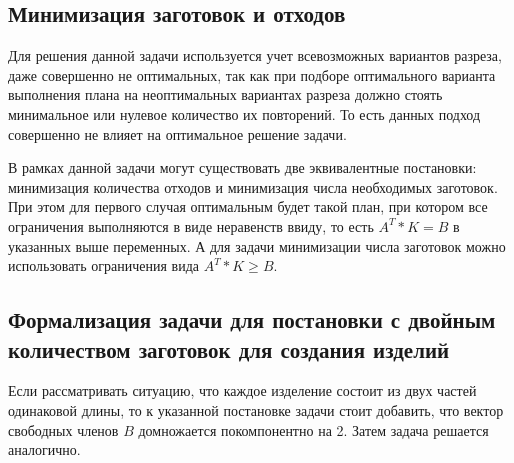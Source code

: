 \documentclass[../body.tex]{subfiles}
\begin{document}
\subsection{Минимизация заготовок и отходов}
Для решения данной задачи используется учет всевозможных вариантов разреза, даже совершенно не оптимальных, так как при подборе оптимального варианта выполнения плана на неоптимальных вариантах разреза должно стоять минимальное или нулевое количество их повторений. То есть данных подход совершенно не влияет на оптимальное решение задачи.

В рамках данной задачи могут существовать две эквивалентные постановки: минимизация количества отходов и минимизация числа необходимых заготовок. При этом для первого случая оптимальным будет такой план, при котором все ограничения выполняются в виде неравенств ввиду, то есть $A^T*K=B$ в указанных выше переменных. А для задачи минимизации числа заготовок можно использовать ограничения вида $A^T*K\geq B$.

\subsection{Формализация задачи для постановки с двойным количеством заготовок для создания изделий}
Если рассматривать ситуацию, что каждое изделение состоит из двух частей одинаковой длины, то к указанной постановке задачи стоит добавить, что вектор свободных членов $B$ домножается покомпонентно на 2. Затем задача решается аналогично.
\end{document}
